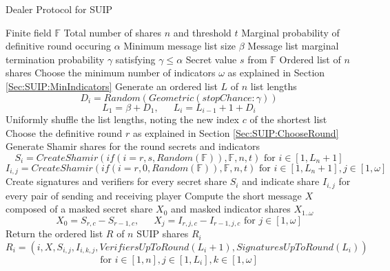 \documentclass{dalcsthesis}
\begin{document}
\begin{algorithm}
  \caption{Dealer Protocol for SUIP}
  \label{alg:SUIP:Dealer}
  \begin{algorithmic}
    \INPUT Finite field $\mathbb{F}$
    \INPUT Total number of shares $n$ and threshold $t$
    \INPUT Marginal probability of definitive round occuring $\alpha$
    \INPUT Minimum message list size $\beta$
    \INPUT Message list marginal termination probability $\gamma$ satisfying $\gamma \leq \alpha$
    \INPUT Secret value $s$ from $\mathbb{F}$
    \OUTPUT Ordered list of $n$ shares
    \STATE Choose the minimum number of indicators $\omega$ as explained in Section \ref{Sec:SUIP:MinIndicators}
    \STATE Generate an ordered list $L$ of $n$ list lengths
    	$$D_i = Random(Geometric(stopChance: \gamma))$$
    	$$L_1 = \beta + D_1 \text{, } \text{ } \text{ } L_i = L_{i-1} + 1 + D_i$$
    \STATE Uniformly shuffle the list lengths, noting the new index $c$ of the shortest list
    \STATE Choose the definitive round $r$ as explained in Section \ref{Sec:SUIP:ChooseRound}
    \STATE Generate Shamir shares for the round secrets and indicators
    	$$S_{i} = CreateShamir(if(i = r, s, Random(\mathbb{F})), \mathbb{F}, n, t) \text{ for } i \in [1, L_n+1]$$
    	$$I_{i,j} = CreateShamir(if(i = r, 0, Random(\mathbb{F})), \mathbb{F}, n, t) \text{ for } i \in [1, L_n+1], j \in [1, \omega]$$
    \STATE Create signatures and verifiers for every secret share $S_i$ and indicate share $I_{i,j}$ for every pair of sending and receiving player
    \STATE Compute the short message $X$ composed of a masked secret share $X_0$ and masked indicator shares $X_{1..\omega}$
    	$$X_0 = S_{r,c} - S_{r-1,c} \text{, } \text{ } \text{ } X_j = I_{r,j,c} - I_{r-1,j,c} \text{ for } j \in [1, \omega]$$
    \STATE Return the ordered list $R$ of $n$ SUIP shares $R_i$
    	$$R_i = (i, X, S_{i,j}, I_{i,k,j}, VerifiersUpToRound(L_i+1), SignaturesUpToRound(L_i))$$
    	$$\text{for } i \in [1, n], j \in [1, L_i], k \in [1, \omega]$$
  \end{algorithmic}
\end{algorithm}
\end{document}
